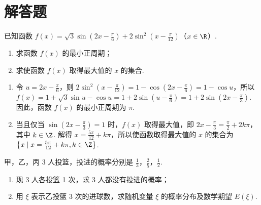 \section{解答题}
\begin{problem}
已知函数 \( f(x) = \sqrt{3} \sin \left(2x - \frac{\pi}{6}\right) + 2 \sin^2 \left(x - \frac{\pi}{12}\right) \)（\(x \in \R\)）.

\begin{enumerate}
\item 求函数 \( f(x) \) 的最小正周期；
\item 求使函数 \( f(x) \) 取得最大值的 \(x\) 的集合.
\end{enumerate}
\end{problem}

\begin{solution}
\begin{enumerate}
\item 令 \(u=2x-\frac{\pi}{6}\)，则 \(2\sin^2\left(x-\frac{\pi}{12}\right)=1-\cos\left(2x-\frac{\pi}{6}\right)=1-\cos u\)，所以 \(f(x)=1+\sqrt{3}\sin u-\cos u=1+2\sin\left(u-\frac{\pi}{6}\right)=1+2\sin\left(2x-\frac{\pi}{3}\right)\). 因此，函数 \(f(x)\) 的最小正周期为 \(\pi\).
\item 当且仅当 \(\sin\left(2x-\frac{\pi}{3}\right)=1\) 时，\(f(x)\) 取得最大值，即 \(2x-\frac{\pi}{3}=\frac{\pi}{2}+2k\pi\)，其中 \(k\in\Z\). 解得 \(x=\frac{5\pi}{12}+k\pi\)，所以使函数取得最大值的 \(x\) 的集合为 \(\left\{x\mid x=\frac{5\pi}{12}+k\pi,k\in\Z\right\}\).
\end{enumerate}
\end{solution}

\begin{problem}
甲，乙，丙 3 人投篮，投进的概率分别是 \(\frac{1}{3}\)，\(\frac{2}{5}\)，\(\frac{1}{2}\).

\begin{enumerate}
\item 现 3 人各投篮 1 次，求 3 人都没有投进的概率；
\item 用 \( \xi \) 表示乙投篮 3 次的进球数，求随机变量 \( \xi \) 的概率分布及数学期望 \( E(\xi) \).
\end{enumerate}
\end{problem}

